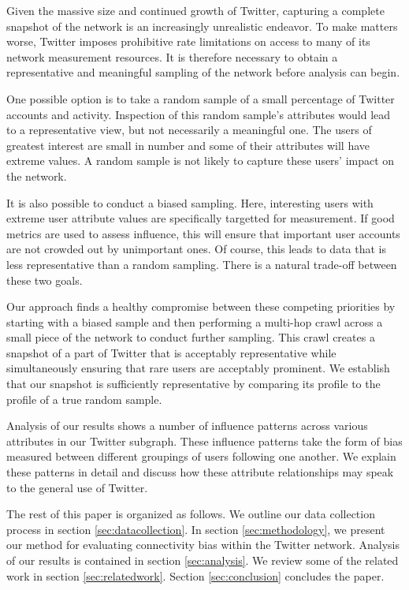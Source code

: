 Given the massive size and continued growth of Twitter, capturing a complete snapshot of the network is an increasingly unrealistic endeavor.  To make matters worse, Twitter imposes prohibitive rate limitations on access to many of its network measurement resources.  It is therefore necessary to obtain a representative and meaningful sampling of the network before analysis can begin.

One possible option is to take a random sample of a small percentage of Twitter accounts and activity.  Inspection of this random sample's attributes would lead to a representative view, but not necessarily a meaningful one.  The users of greatest interest are small in number and some of their attributes will have extreme values.  A random sample is not likely to capture these users' impact on the network.

It is also possible to conduct a biased sampling.  Here, interesting users with extreme user attribute values are specifically targetted for measurement.  If good metrics are used to assess influence, this will ensure that important user accounts are not crowded out by unimportant ones.  Of course, this leads to data that is less representative than a random sampling.  There is a natural trade-off between these two goals.

Our approach finds a healthy compromise between these competing priorities by starting with a biased sample and then performing a multi-hop crawl across a small piece of the network to conduct further sampling.  This crawl creates a snapshot of a part of Twitter that is acceptably representative while simultaneously ensuring that rare users are acceptably prominent.  We establish that our snapshot is sufficiently representative by comparing its profile to the profile of a true random sample.

Analysis of our results shows a number of influence patterns across various attributes in our Twitter subgraph.  These influence patterns take the form of bias measured between different groupings of users following one another.  We explain these patterns in detail and discuss how these attribute relationships may speak to the general use of Twitter.

The rest of this paper is organized as follows.  We outline our data collection process in section \ref{sec:datacollection}.  In section \ref{sec:methodology}, we present our method for evaluating connectivity bias within the Twitter network.  Analysis of our results is contained in section \ref{sec:analysis}.  We review some of the related work in section \ref{sec:relatedwork}.  Section \ref{sec:conclusion} concludes the paper.